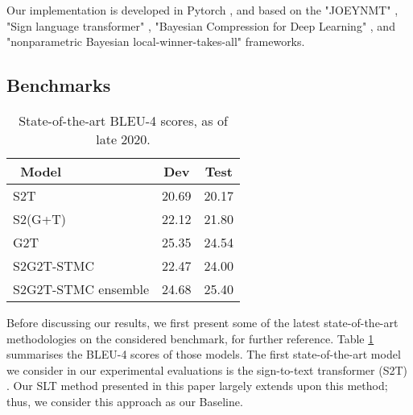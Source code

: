 \documentclass[10pt,twocolumn,letterpaper]{article}
\begin{document}
Our implementation is developed in Pytorch \cite{NEURIPS2019_9015}, and  based on the "JOEYNMT" \cite{kreutzer-etal-2019-joey},   "Sign language transformer" \cite{Camgoz20}, "Bayesian Compression for Deep Learning" \cite{elan2020}, and "nonparametric Bayesian local-winner-takes-all" \cite{panousis2019nonparametric} frameworks.











\subsection{Benchmarks}
\begin{table}[h]
\caption{State-of-the-art BLEU-4 scores, as of late 2020.}
\begin{center}
\begin{tabular}{|l||c|c|}
\hline
\ Model & Dev & Test  \\ 
\hline\hline
S2T  \cite{Camgoz20}          & 20.69    & 20.17         \\ 
S2(G+T) \cite{Camgoz20}   & 22.12   & 21.80         \\ 
\hline
G2T \cite{Camgoz20}          & 25.35    & 24.54         \\ 
\hline
S2G2T-STMC \cite{yin2020}        & 22.47   &  24.00   \\ 
S2G2T-STMC ensemble \cite{yin2020}   &  24.68   &  25.40     \\ 
\hline
\end{tabular}
\label{tab:benchmark}
\end{center}
\end{table}
Before discussing our results,  we first present some of the latest state-of-the-art methodologies on the considered benchmark, for further reference.  Table \ref{tab:benchmark} summarises the BLEU-4 scores of those models. The first state-of-the-art  model  we  consider  in our  experimental evaluations  is  the  sign-to-text transformer  (S2T)  \cite{Camgoz20}.   Our  SLT  method presented in this paper largely extends upon  this method; thus, we consider this approach as our Baseline.
\end{document}
